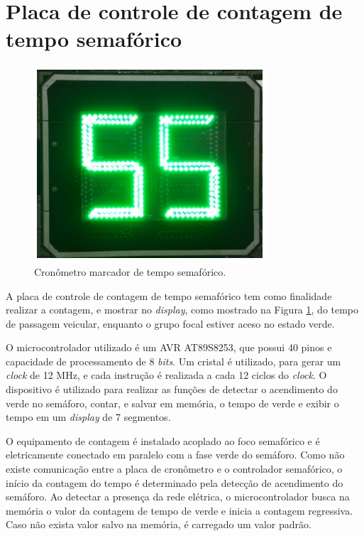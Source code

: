 \section{Placa de controle de contagem de tempo semafórico}

\begin{figure}[ht]
    \begin{center}
    \includegraphics{figuras/cronometro.PNG}
    \end{center}
    \caption[Sistema de cronômetro]{Cronômetro marcador de tempo semafórico.}
    \label{cronometro}
\end{figure}

A placa de controle de contagem de tempo semafórico tem como finalidade realizar a contagem, e mostrar no \textit{display}, como mostrado na Figura \ref{cronometro}, do tempo de passagem veicular, enquanto o grupo focal estiver aceso no estado verde.

O microcontrolador utilizado é um AVR AT89S8253, que possui 40 pinos e capacidade de processamento de 8 \textit{bits}. Um cristal é utilizado, para gerar um \textit{clock} de 12 MHz, e cada instrução é realizada a cada 12 ciclos do \textit{clock}. O dispositivo é utilizado para realizar as funções de detectar o acendimento do verde no semáforo, contar, e salvar em memória, o tempo de verde e exibir o tempo em um \textit{display} de 7 segmentos.

O equipamento de contagem é instalado acoplado ao foco semafórico e é eletricamente conectado em paralelo com a fase verde do semáforo. Como não existe comunicação entre a placa de cronômetro e o controlador semafórico, o início da contagem do tempo é determinado pela detecção de acendimento do semáforo. Ao detectar a presença da rede elétrica, o microcontrolador busca na memória o valor da contagem de tempo de verde e inicia a contagem regressiva. Caso não exista valor salvo na memória, é carregado um valor padrão.

